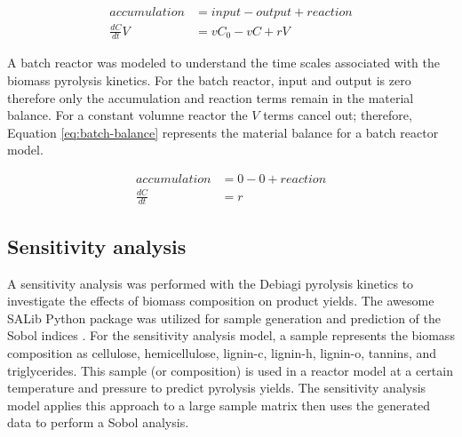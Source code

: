 \begin{equation}
    \label{eq:typical-balance}
    \begin{aligned}
        accumulation &= input - output + reaction \\
        \frac{dC}{dt} V &= v C_0 - v C + r V
    \end{aligned}
\end{equation}

A batch reactor was modeled to understand the time scales associated with the biomass pyrolysis kinetics. For the batch reactor, input and output is zero therefore only the accumulation and reaction terms remain in the material balance. For a constant volumne reactor the $V$ terms cancel out; therefore, Equation \ref{eq:batch-balance} represents the material balance for a batch reactor model.

\begin{equation}
    \label{eq:batch-balance}
    \begin{aligned}
        accumulation &= 0 - 0 + reaction \\
        \frac{dC}{dt} &= r
    \end{aligned}
\end{equation}

\subsection{Sensitivity analysis}

A sensitivity analysis was performed with the Debiagi pyrolysis kinetics to investigate the effects of biomass composition on product yields. The awesome SALib Python package was utilized for sample generation and prediction of the Sobol indices \cite{Herman-2017}. For the sensitivity analysis model, a sample represents the biomass composition as cellulose, hemicellulose, lignin-c, lignin-h, lignin-o, tannins, and triglycerides. This sample (or composition) is used in a reactor model at a certain temperature and pressure to predict pyrolysis yields. The sensitivity analysis model applies this approach to a large sample matrix then uses the generated data to perform a Sobol analysis.
